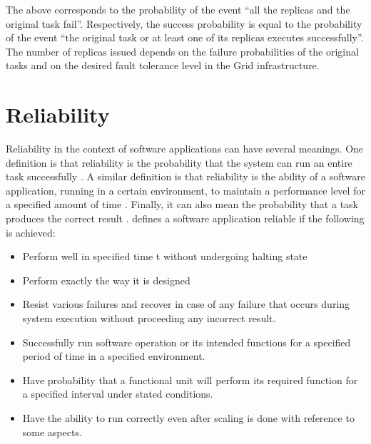 \documentclass{cslthse-msc}
\begin{document}
The above corresponds to the probability of the event “all the replicas and the original task fail”. Respectively, the success probability is equal to the probability of the event “the original task or at least one of its replicas executes successfully”. The number of replicas issued depends on the failure probabilities of the original tasks and on the desired fault tolerance level in the Grid infrastructure. 

\section{Reliability} \label{subsec:definitions}
Reliability in the context of software applications can have several meanings. One definition is that reliability is the probability that the system can run an entire task successfully \cite{taskAllocation}. A similar definition is that reliability is the ability of a software application, running in a certain environment, to maintain a performance level for a specified amount of time \cite{X}. Finally, it can also mean the probability that a task produces the correct result \cite{X}. \cite{surveyReliabilityDistr} defines a software application reliable if the following is achieved:
\begin{itemize}
\item Perform well in specified time t without undergoing halting state
\item Perform exactly the way it is designed
\item Resist various failures and recover in case of any failure that occurs during system execution without proceeding any incorrect result.
\item Successfully run software operation or its intended functions for a specified period of time in a specified environment.
\item Have probability that a functional unit will perform its required function for a specified interval under stated conditions.
\item Have the ability to run correctly even after scaling is done with reference to some aspects.
\end{itemize}
\end{document}
